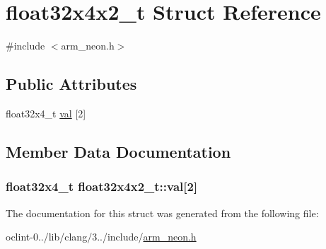 \hypertarget{structfloat32x4x2__t}{\section{float32x4x2\-\_\-t Struct Reference}
\label{structfloat32x4x2__t}
}


{\ttfamily \#include $<$arm\-\_\-neon.\-h$>$}

\subsection*{Public Attributes}
\begin{DoxyCompactItemize}
\item 
float32x4\-\_\-t \hyperlink{structfloat32x4x2__t_a468767025e7b5f8807b6c70de84a34c5}{val} \mbox{[}2\mbox{]}
\end{DoxyCompactItemize}


\subsection{Member Data Documentation}
\hypertarget{structfloat32x4x2__t_a468767025e7b5f8807b6c70de84a34c5}{
\subsubsection[{val}]{\setlength{\rightskip}{0pt plus 5cm}float32x4\-\_\-t float32x4x2\-\_\-t\-::val\mbox{[}2\mbox{]}}}\label{structfloat32x4x2__t_a468767025e7b5f8807b6c70de84a34c5}


The documentation for this struct was generated from the following file\-:\begin{DoxyCompactItemize}
\item 
oclint-\/0../lib/clang/3../include/\hyperlink{arm__neon_8h}{arm\-\_\-neon.\-h}\end{DoxyCompactItemize}
